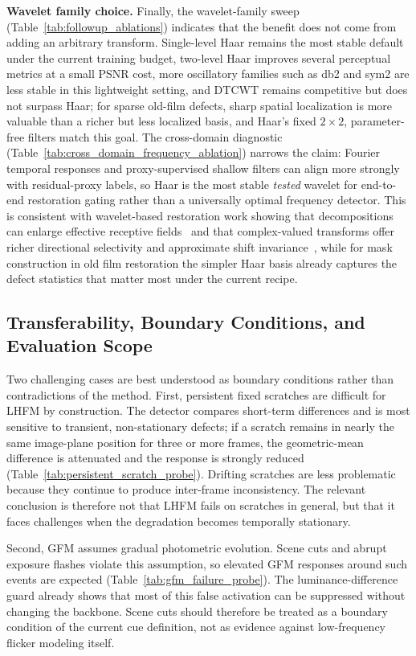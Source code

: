\textbf{Wavelet family choice.}
Finally, the wavelet-family sweep (Table~\ref{tab:followup_ablations}) indicates that the benefit does not come from adding an arbitrary transform. Single-level Haar remains the most stable default under the current training budget, two-level Haar improves several perceptual metrics at a small PSNR cost, more oscillatory families such as db2 and sym2 are less stable in this lightweight setting, and DTCWT remains competitive but does not surpass Haar; for sparse old-film defects, sharp spatial localization is more valuable than a richer but less localized basis, and Haar's fixed $2\times2$, parameter-free filters match this goal. The cross-domain diagnostic (Table~\ref{tab:cross_domain_frequency_ablation}) narrows the claim: Fourier temporal responses and proxy-supervised shallow filters can align more strongly with residual-proxy labels, so Haar is the most stable \emph{tested} wavelet for end-to-end restoration gating rather than a universally optimal frequency detector. This is consistent with wavelet-based restoration work showing that decompositions can enlarge effective receptive fields~\cite{liu2018mwcnn} and that complex-valued transforms offer richer directional selectivity and approximate shift invariance~\cite{selesnick2005dual}, while for mask construction in old film restoration the simpler Haar basis already captures the defect statistics that matter most under the current recipe.

\subsection{Transferability, Boundary Conditions, and Evaluation Scope}\label{subsec:transferability}

Two challenging cases are best understood as boundary conditions rather than contradictions of the method. First, persistent fixed scratches are difficult for LHFM by construction. The detector compares short-term differences and is most sensitive to transient, non-stationary defects; if a scratch remains in nearly the same image-plane position for three or more frames, the geometric-mean difference is attenuated and the response is strongly reduced (Table~\ref{tab:persistent_scratch_probe}). Drifting scratches are less problematic because they continue to produce inter-frame inconsistency. The relevant conclusion is therefore not that LHFM fails on scratches in general, but that it faces challenges when the degradation becomes temporally stationary.

Second, GFM assumes gradual photometric evolution. Scene cuts and abrupt exposure flashes violate this assumption, so elevated GFM responses around such events are expected (Table~\ref{tab:gfm_failure_probe}). The luminance-difference guard already shows that most of this false activation can be suppressed without changing the backbone. Scene cuts should therefore be treated as a boundary condition of the current cue definition, not as evidence against low-frequency flicker modeling itself.

